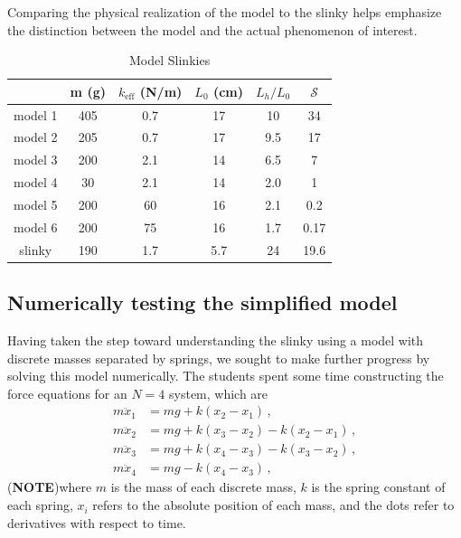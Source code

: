 \documentclass[prb,preprint]{revtex4-1}
\newcommand{\NOTEMARG}[1]{\marginpar{\raggedright\scriptsize\textbf{NOTE:} #1} (\textbf{NOTE})}
\newcommand{\calvin}[2]{\textcolor{purple}{\sout{#1}#2}}
\newcommand{\eq}[1]{eq.~\eqref{eq:#1}}
\newcommand{\nn}{\nonumber}
\begin{document}
Comparing the physical realization of the model to the slinky 
helps emphasize the distinction between the model and the actual phenomenon of interest.


\begin{table}[ht]
\caption{Model Slinkies} %
\centering %
\begin{tabular}{c c c c c c} %
\hline\hline %
 & m (g) & $k_\text{eff}$ (N/m) & $L_0$ (cm) & $L_h/L_0$ & $\mathcal{S}$ \\ [0.5ex] %
\hline %
model 1 & 405 & 0.7 	& 17   & 10	& 34		\\ %
model 2 & 205 & 0.7	& 17   & 9.5	& 17		\\
model 3 & 200 & 2.1	& 14   & 6.5	& 7		\\
model 4 & 30   & 2.1	& 14   & 2.0	& 1		\\
model 5 & 200 & 60	& 16   & 2.1	& 0.2		\\
model 6 & 200 & 75	& 16   & 1.7	& 0.17		\\
slinky     & 190 & 1.7   & 5.7   & 24	& 19.6		\\ [1ex] %
\hline %
\end{tabular}
\label{table:slinkies} %
\end{table}
 


\subsection{Numerically testing the simplified model}
\label{subsec:forcesnumeric}
Having taken the step toward understanding the slinky using a model with
discrete masses separated by springs, we sought to make further progress by
solving this model numerically. The students spent some time constructing the
force equations for an $N=4$ system, which are
\begin{align} \label{eq:coupleddes}
m\ddot{x}_1 &= mg + k(x_2 - x_1)\,,
\nn\\
m\ddot{x}_2 &= mg + k(x_3 - x_2) - k(x_2 - x_1)
\,,\nn\\
m\ddot{x}_3 &= mg + k(x_4 - x_3) - k(x_3 - x_2)
\,,\nn\\
m\ddot{x}_4 &= mg                - k(x_4 - x_3)
\,,\end{align}
\NOTEMARG{\calvin{}{include \eq{coupleddes}?}}where $m$ is the mass of each discrete mass, $k$ is the spring constant of each
spring, $x_i$ refers to the absolute position of each mass, and the dots refer to
derivatives with respect to time.
\end{document}
